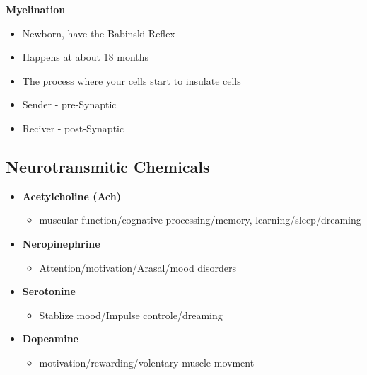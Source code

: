 \documentclass{report}
\newcommand{\nt}[1]{\begin{note}#1\end{note}}
\begin{document}
\nt{
\textbf{Myelination}
\begin{itemize}
    \item Newborn, have the Babinski Reflex
    \item Happens at about 18 months
    \item The process where your cells start to insulate cells
\end{itemize}
}

\nt{
\begin{itemize}
\item Sender - pre-Synaptic
\item Reciver - post-Synaptic
\end{itemize}
}
\subsection*{Neurotransmitic Chemicals}
\nt{
\begin{itemize}
    \item \textbf{Acetylcholine (Ach)}
        \begin{itemize}
            \item muscular function/cognative processing/memory, learning/sleep/dreaming
        \end{itemize}
    \item \textbf{Neropinephrine}
        \begin{itemize}
            \item Attention/motivation/Arasal/mood disorders
        \end{itemize}
    \item \textbf{Serotonine}
        \begin{itemize}
            \item Stablize mood/Impulse controle/dreaming
        \end{itemize}
          \item \textbf{Dopeamine}
        \begin{itemize}
            \item motivation/rewarding/volentary muscle movment
        \end{itemize}
\end{itemize}
}
\end{document}
